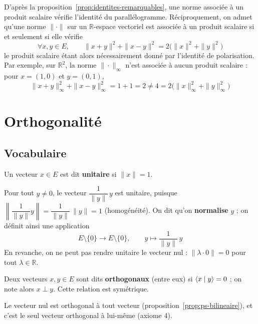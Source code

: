 \begin{remarque}
D'après la proposition~\ref{prop:identites-remarquables}, une norme associée à un produit scalaire vérifie l'identité du parallélogramme. Réciproquement, on admet qu'une norme $\|\cdot\|$ sur un $\mathbb{R}$-espace vectoriel est associée à un produit scalaire si et seulement si elle vérifie
\[\forall x,y\in E,\qquad\|x+y\|^2+\|x-y\|^2=2\big(\|x\|^2+\|y\|^2\big)\]
le produit scalaire étant alors nécessairement donné par l'identité de polarisation. Par exemple, sur $\mathbb{R}^2$, la norme $\|\cdot\|_\infty$ n'est associée à aucun produit scalaire : pour $x=(1,0)$ et $y=(0,1)$,
\[\|x+y\|_\infty^2+\|x-y\|_\infty^2=1+1=2\neq 4=2\big(\|x\|_\infty^2+\|y\|_\infty^2\big)\]
\end{remarque}

\section{Orthogonalité}

\subsection{Vocabulaire}

\begin{defi}
\label{defi:unitaire}
Un vecteur $x\in E$ est dit \textbf{unitaire} si $\|x\|=1$.
\end{defi}

Pour tout $y\neq 0$, le vecteur $\dfrac{1}{\|y\|}\,y$ est unitaire, puisque $\left\|\dfrac{1}{\|y\|}y\right\|=\dfrac{1}{\|y\|}\,\|y\|=1$ (homogénéité). On dit qu'on \textbf{normalise} $y$ ; on définit ainsi une application
\[E\setminus\{0\}\to E\setminus\{0\},\qquad y\mapsto\frac{1}{\|y\|}\,y\]
En revanche, on ne peut pas rendre unitaire le vecteur nul : $\|\lambda\cdot 0\|=0$ pour tout $\lambda\in\mathbb{R}$.

\begin{defi}
\label{defi:orthogonaux}
Deux vecteurs $x,y\in E$ sont dits \textbf{orthogonaux} (entre eux) si $\langle x\mid y\rangle=0$ ; on note alors $x\perp y$. Cette relation est symétrique.
\end{defi}

\begin{remarque}
Le vecteur nul est orthogonal à tout vecteur (proposition~\ref{prop:ps-bilineaire}), et c'est le seul vecteur orthogonal à lui-même (axiome 4).
\end{remarque}

